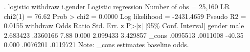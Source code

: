 . logistic withdraw i.gender
{\smallskip}
Logistic regression                             Number of obs     =     25,160
                                                LR chi2(1)        =      76.62
                                                Prob > chi2       =     0.0000
Log likelihood = -2431.4659                     Pseudo R2         =     0.0155
{\smallskip}
    withdraw {\VBAR} Odds Ratio   Std. Err.      z    P>|z|     [95\% Conf. Interval]
      gender {\VBAR}
       male  {\VBAR}   2.683423   .3360166     7.88   0.000     2.099433    3.429857
       _cons {\VBAR}   .0095513   .0011008   -40.35   0.000     .0076201    .0119721
Note: _cons estimates baseline odds.
{\smallskip}
